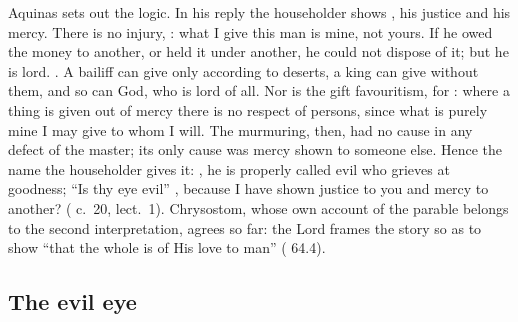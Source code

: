 Aquinas sets out the logic. In his reply the householder shows , his justice and his mercy. There is no injury,
: what I give this man
is mine, not yours. If he owed the money to another, or held it under another,
he could not dispose of it; but he is lord. . A bailiff can give only according to deserts, a king
can give without them, and so can God, who is lord of all. Nor is the gift
favouritism, for : where a thing is given out of mercy there is no respect of
persons, since what is purely mine I may give to whom I will. The murmuring,
then, had no cause in any defect of the master; its only cause was mercy shown
to someone else. Hence the name the householder gives it: , he is properly called evil who grieves at
goodness; ``Is thy eye evil'' , because I have shown justice to you and mercy to
another? ( c.~20, lect.~1). Chrysostom, whose own
account of the parable belongs to the second interpretation, agrees so far:
the Lord frames the story so as to show ``that the whole is of His love to
man'' ( 64.4).

\subsection{The evil eye}


